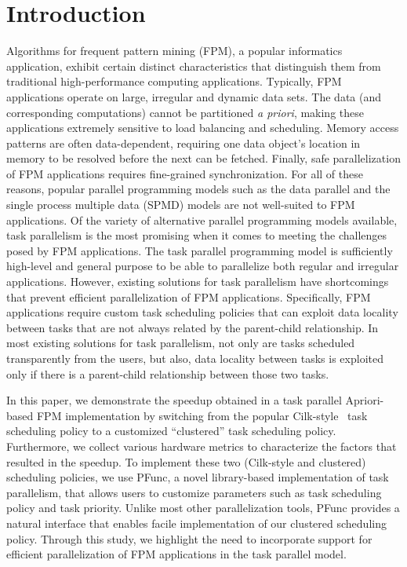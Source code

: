 \documentclass{IOS-Book-Article}
\begin{document}
\section*{Introduction}
Algorithms for frequent pattern mining (FPM), a popular informatics
application, exhibit certain distinct characteristics that distinguish them
from traditional high-performance computing applications. Typically, FPM
applications operate on large, irregular and dynamic data sets.  The data (and
corresponding computations) cannot be partitioned \textit{a priori}, making
these applications extremely sensitive to load balancing and scheduling.
Memory access patterns are often data-dependent, requiring one data object's
location in memory to be resolved before the next can be fetched. Finally,
safe parallelization of FPM applications requires fine-grained synchronization.
For all of these reasons, popular parallel programming models such as the data
parallel and the single process multiple data (SPMD) models are not well-suited
to FPM applications.
Of the variety of alternative parallel programming models available, task
parallelism is the most promising when it comes to meeting the challenges posed
by FPM applications. The task parallel programming model is sufficiently
high-level and general purpose to be able to parallelize both regular and
irregular applications. However, existing solutions for task parallelism have
shortcomings that prevent efficient parallelization of FPM applications.
Specifically, FPM applications require custom task scheduling policies that can
exploit data locality between tasks that are not always related by the
parent-child relationship. In most existing solutions for task parallelism, not
only are tasks scheduled transparently from the users, but also, data locality
between tasks is exploited only if there is a parent-child relationship between
those two tasks. 

In this paper, we demonstrate the speedup obtained in a task parallel
Apriori-based FPM implementation by switching from the popular
Cilk-style~\cite{Blumofe94} task scheduling policy to a customized
``clustered'' task scheduling policy. Furthermore, we collect various hardware
metrics to characterize the factors that resulted in the speedup.  To implement
these two (Cilk-style and clustered) scheduling policies, we use PFunc, a novel
library-based implementation of task parallelism, that allows users to
customize parameters such as task scheduling policy and task priority. Unlike
most other parallelization tools, PFunc provides a natural interface that
enables facile implementation of our clustered scheduling policy.  Through this
study, we highlight the need to incorporate support for efficient
parallelization of FPM applications in the task parallel model.
\end{document}
